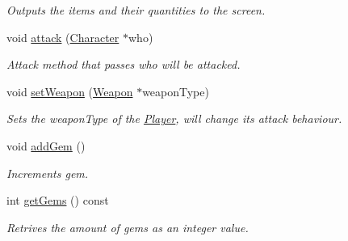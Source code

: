 \begin{DoxyCompactItemize}
\begin{DoxyCompactList}\small\item\em Outputs the items and their quantities to the screen. \item\end{DoxyCompactList}\item 
\hypertarget{classPlayer_a933947160a754eebca73275b8d45ae38}{
void \hyperlink{classPlayer_a933947160a754eebca73275b8d45ae38}{attack} (\hyperlink{classCharacter}{Character} $\ast$who)}
\label{classPlayer_a933947160a754eebca73275b8d45ae38}

\begin{DoxyCompactList}\small\item\em Attack method that passes who will be attacked. \item\end{DoxyCompactList}\item 
\hypertarget{classPlayer_a0c4b8585e95d3092ec4d0f852091f12a}{
void \hyperlink{classPlayer_a0c4b8585e95d3092ec4d0f852091f12a}{setWeapon} (\hyperlink{classWeapon}{Weapon} $\ast$weaponType)}
\label{classPlayer_a0c4b8585e95d3092ec4d0f852091f12a}

\begin{DoxyCompactList}\small\item\em Sets the weaponType of the \hyperlink{classPlayer}{Player}, will change its attack behaviour. \item\end{DoxyCompactList}\item 
\hypertarget{classPlayer_ad024eb2882ef89b6453364470d80b11e}{
void \hyperlink{classPlayer_ad024eb2882ef89b6453364470d80b11e}{addGem} ()}
\label{classPlayer_ad024eb2882ef89b6453364470d80b11e}

\begin{DoxyCompactList}\small\item\em Increments gem. \item\end{DoxyCompactList}\item 
\hypertarget{classPlayer_a8064e25e14fb457b8229be32789add62}{
int \hyperlink{classPlayer_a8064e25e14fb457b8229be32789add62}{getGems} () const }
\label{classPlayer_a8064e25e14fb457b8229be32789add62}

\begin{DoxyCompactList}\small\item\em Retrives the amount of gems as an integer value. \item\end{DoxyCompactList}\end{DoxyCompactItemize}


